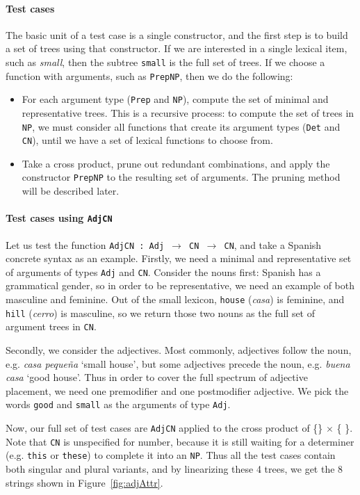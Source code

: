 \documentclass[11pt]{article}
\def\t#1{\texttt{#1}}
\begin{document}
\paragraph{Test cases} 
The basic unit of a test case is a single constructor, and the first step 
is to build a set of trees using that constructor.
If we are interested in a single lexical item, such as \emph{small}, 
then the subtree \t{small} is the full set of trees. If we choose a function 
with arguments, such as \t{PrepNP}, then we do the following: 
\begin{itemize}
\item For each argument type (\t{Prep} and \t{NP}), compute the
  set of minimal and representative trees. This is a recursive
  process: to compute the set of trees in \t{NP}, we must consider
  all functions that create its argument types (\t{Det} and \t{CN}),
  until we have a set of lexical functions to choose from. 
\item Take a cross product, prune out redundant combinations, and
  apply the constructor \t{PrepNP} to the resulting set of
  arguments. The pruning method will be described later. 
\end{itemize}

\paragraph{Test cases using \t{AdjCN}} Let us test the function
\t{AdjCN : Adj $\rightarrow$ CN $\rightarrow$ CN}, and take a Spanish
concrete syntax as an example. 
Firstly, we need a minimal and representative set of arguments of types
\t{Adj} and \t{CN}. Consider the nouns first: Spanish has a
grammatical gender, so in order to be representative, we need an
example of both masculine and feminine. Out of the small lexicon,
\t{house} (\emph{casa}) is feminine, and \t{hill} (\emph{cerro}) is
masculine, so we return those two nouns as the full set of argument
trees in \t{CN}. 

Secondly, we consider the adjectives. Most commonly, adjectives follow
the noun, e.g. \emph{casa peque\~{n}a} `small house', but some
adjectives precede the noun, e.g. \emph{buena casa} `good house'. Thus 
in order to cover the full spectrum of adjective placement, we need
one premodifier and one postmodifier adjective. We pick the words
\t{good} and \t{small} as the arguments of type \t{Adj}. 

Now, our full set of test cases are \t{AdjCN} applied to the cross
product of \{\}
$\times$ \{ \}.
Note that \t{CN} is unspecified for number, because it is still waiting for a
determiner (e.g. \t{this} or \t{these}) to complete it into an
\t{NP}. Thus all the test cases contain both singular and plural
variants, and by linearizing these 4 trees, we get the 8 strings shown
in Figure~\ref{fig:adjAttr}.
\end{document}
